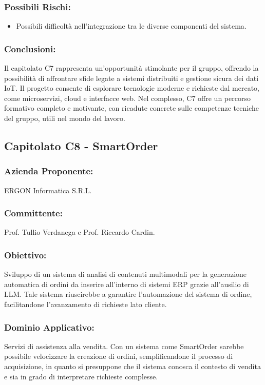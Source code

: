 \documentclass[a4paper,12pt]{article}
\begin{document}
\subsubsection*{Possibili Rischi:}
\begin{itemize}
    \item Possibili difficoltà nell'integrazione tra le diverse componenti del sistema.
\end{itemize}

\subsubsection*{Conclusioni:}
Il capitolato C7 rappresenta un’opportunità stimolante per il gruppo, offrendo la possibilità di affrontare sfide legate a sistemi distribuiti e gestione sicura dei dati IoT.
Il progetto consente di esplorare tecnologie moderne e richieste dal mercato, come microservizi, cloud e interfacce web. Nel complesso, C7 offre un percorso formativo completo e motivante, con ricadute concrete sulle competenze tecniche del gruppo, utili nel mondo del lavoro.
\vspace{2.0cm}

\subsection{Capitolato C8 - SmartOrder}
\subsubsection*{Azienda Proponente:} ERGON Informatica S.R.L.
\subsubsection*{Committente:} Prof. Tullio Verdanega e Prof. Riccardo Cardin.
\subsubsection*{Obiettivo:} Sviluppo di un sistema di analisi di contenuti multimodali per la generazione automatica di ordini da inserire all'interno di sistemi ERP grazie all'ausilio di LLM. Tale sistema riuscirebbe a garantire l'automazione del sistema di ordine, facilitandone l'avanzamento di richieste lato cliente.
\subsubsection*{Dominio Applicativo:} Servizi di assistenza alla vendita. Con un sistema come SmartOrder sarebbe possibile velocizzare la creazione di ordini, semplificandone il processo di acquisizione, in quanto si presuppone che il sistema conosca il contesto di vendita e sia in grado di interpretare richieste complesse.
\end{document}

